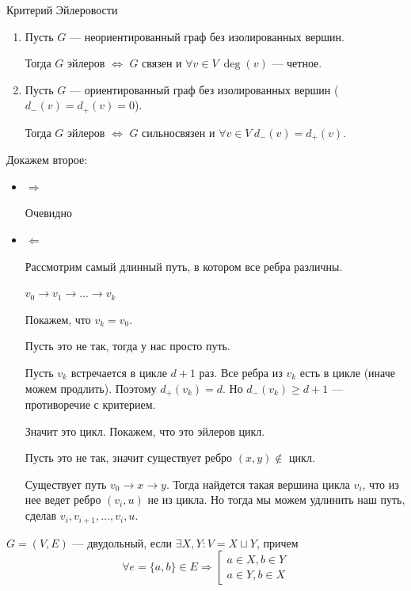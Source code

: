 \begin{thrm}{Критерий Эйлеровости}{}
    \begin{enumerate}
        \item
            Пусть \( G \) --- неориентированный граф без изолированных вершин.

            Тогда \( G \) эйлеров
            \( \Leftrightarrow \)
            \( G \) связен и \( \forall v \in V \ \deg(v) \) --- четное.
        \item
            Пусть \( G \) --- ориентированный граф без изолированных вершин (\(d_-(v) = d_+(v) = 0\)).

            Тогда \( G \) эйлеров
            \( \Leftrightarrow \)
            \( G \) сильносвязен и \( \forall v \in V \ d_-(v) = d_+(v) \).
    \end{enumerate}
\end{thrm}

Докажем второе:
\begin{itemize}
    \item
        \( \Rightarrow \)

        Очевидно
    \item
        \( \Leftarrow \)

        Рассмотрим самый длинный путь, в котором все ребра различны.

        \( v_0 \to v_1 \to \ldots \to v_k \)

        Покажем, что \( v_k = v_0 \).

        Пусть это не так, тогда у нас просто путь.

        Пусть \( v_k \) встречается в цикле \( d + 1 \) раз.
        Все ребра из \( v_k \) есть в цикле (иначе можем продлить).
        Поэтому \( d_+(v_k) = d \).
        Но \( d_-(v_k) \geq d + 1 \) --- противоречие с критерием.

        Значит это цикл.
        Покажем, что это эйлеров цикл.

        Пусть это не так, значит существует ребро \( (x, y) \notin \) цикл.

        Существует путь \( v_0 \to x \to y \).
        Тогда найдется такая вершина цикла \( v_i \), что из нее ведет ребро \( (v_i, u) \) не из цикла.
        Но тогда мы можем удлинить наш путь, сделав \( v_i, v_{i + 1}, \ldots, v_i, u \).
\end{itemize}

\begin{defn}{}{}
    \( G = (V, E) \) --- двудольный, если \( \exists X, Y : V = X \sqcup Y \), причем
    \[
        \forall e = \{ a, b \} \in E
        \Rightarrow
        \left[
            \begin{gathered}
                a \in X, b \in Y
                \\
                a \in Y, b \in X
            \end{gathered}
        \right.
    \]
\end{defn}

